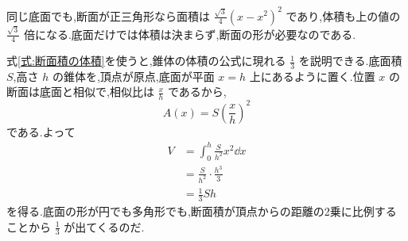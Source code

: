 同じ底面でも,断面が正三角形なら面積は $\frac{\sqrt3}{4}(x-x^2)^2$ であり,体積も上の値の $\frac{\sqrt3}{4}$ 倍になる.底面だけでは体積は決まらず,断面の形が必要なのである.

式\eqref{式:断面積の体積}を使うと,錐体の体積の公式に現れる $\frac13$ を説明できる.底面積 $S$,高さ $h$ の錐体を,頂点が原点,底面が平面 $x=h$ 上にあるように置く.位置 $x$ の断面は底面と相似で,相似比は $\frac xh$ であるから,
\[
A(x)=S\left(\frac xh\right)^2
\]
である.よって
\begin{align*}
V&=\int_0^h\frac{S}{h^2}x^2\dd x\\
 &=\frac{S}{h^2}\cdot\frac{h^3}{3}\\
 &=\frac13Sh
\end{align*}
を得る.底面の形が円でも多角形でも,断面積が頂点からの距離の2乗に比例することから $\frac13$ が出てくるのだ.
